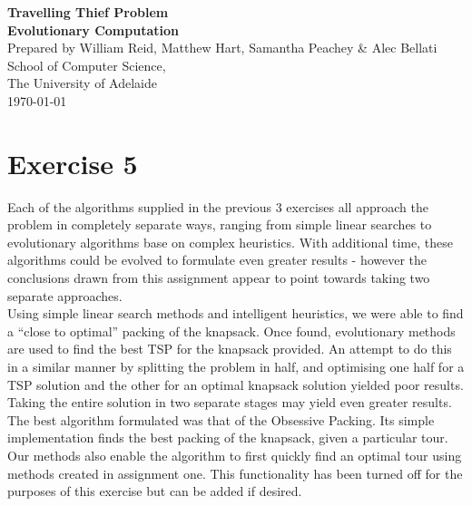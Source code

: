 \documentclass[a4paper,12pt]{article}
\begin{document}
\begin{center}
{\LARGE\bf Travelling Thief Problem}\\
\vspace{0.5cm}
{\Large\bf Evolutionary Computation}\\
\vspace{1cm}
Prepared by William Reid, Matthew Hart, Samantha Peachey \& Alec Bellati\\
\vspace{1cm}
School of Computer Science,\\
The University of Adelaide\\
\vspace{1cm}
\today
\end{center}

\vspace{1cm}
\section*{Exercise 5}
Each of the algorithms supplied in the previous 3 exercises all approach the problem in completely separate ways, ranging from simple linear searches to evolutionary algorithms base on complex heuristics. With additional time, these algorithms could be evolved to formulate even greater results - however the conclusions drawn from this assignment appear to point towards taking two separate approaches.\\

Using simple linear search methods and intelligent heuristics,  we were able to find a ``close to optimal'' packing of the knapsack. Once found, evolutionary methods are used to find the best TSP for the knapsack provided. An attempt to do this in a similar manner by splitting the problem in half, and optimising one half for a TSP solution and the other for an optimal knapsack solution yielded poor results. Taking the entire solution in two separate stages may yield even greater results.\\

The best algorithm formulated was that of the Obsessive Packing. Its simple implementation finds the best packing of the knapsack, given a particular tour. Our methods also enable the algorithm to first quickly find an optimal tour using methods created in assignment one. This functionality has been turned off for the purposes of this exercise but can be added if desired. 

\newpage
\end{document}
